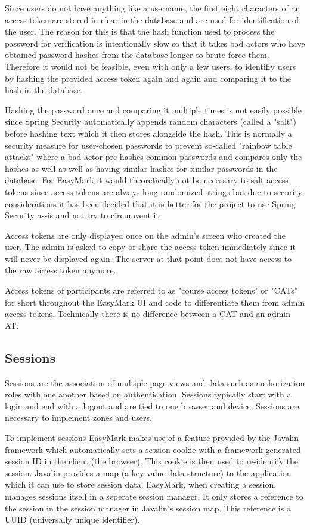 \documentclass[12pt,a4paper,oneside]{report}
\begin{document}
	Since users do not have anything like a username, the first eight characters of an access token are stored in clear in the database and are used for identification of the user. The reason for this is that the hash function used to process the password for verification is intentionally slow so that it takes bad actors who have obtained password hashes from the database  longer to brute force them. Therefore it would not be feasible, even with only a few users, to identifiy users by hashing the provided access token again and again and comparing it to the hash in the database.

	Hashing the password once and comparing it multiple times is not easily possible since Spring Security automatically appends random characters (called a "salt") before hashing text which it then stores alongside the hash. This is normally a security measure for user-chosen passwords to prevent so-called "rainbow table attacks" where a bad actor pre-hashes common passwords and compares only the hashes as well as well as having similar hashes for similar passwords in the database. For EasyMark it would theoretically not be necessary to salt access tokens since access tokens are always long randomized strings but due to security considerations it has been decided that it is better for the project to use Spring Security as-is and not try to circumvent it.

	Access tokens are only displayed once on the admin's screen who created the user. The admin is asked to copy or share the access token immediately since it will never be displayed again. The server at that point does not have access to the raw access token anymore.

	Access tokens of participants are referred to as "course access tokens" or "CATs" for short throughout the EasyMark UI and code to differentiate them from admin access tokens. Technically there is no difference between a CAT and an admin AT.

	\subsection{Sessions}
	Sessions are the association of multiple page views and data such as authorization roles with one another based on authentication. Sessions typically start with a login and end with a logout and are tied to one browser and device. Sessions are necessary to implement zones and users.

	To implement sessions EasyMark makes use of a feature provided by the Javalin framework which automatically sets a session cookie with a framework-generated session ID in the client (the browser). This cookie is then used to re-identify the session. Javalin provides a map (a key-value data structure) to the application which it can use to store session data. EasyMark, when creating a session, manages sessions itself in a seperate session manager. It only stores a reference to the session in the session manager in Javalin's session map. This reference is a UUID (universally unique identifier).
\end{document}
